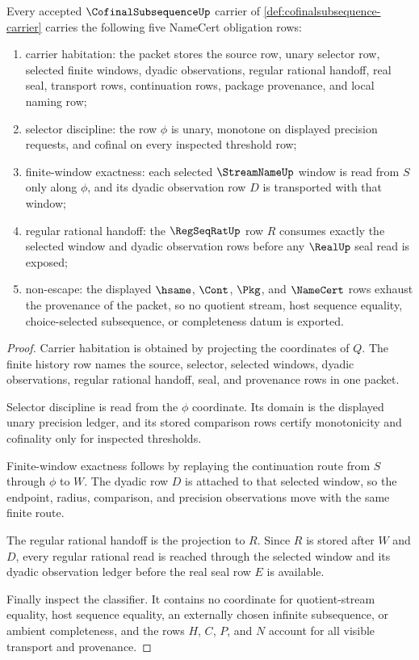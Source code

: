 \begin{theorem}
\label{thm:cofinalsubsequence-namecert-obligations}
Every accepted $\CofinalSubsequenceUp$ carrier of \autoref{def:cofinalsubsequence-carrier} carries the following five NameCert obligation rows:
\begin{enumerate}
\item carrier habitation: the packet stores the source row, unary selector row, selected finite windows, dyadic observations, regular rational handoff, real seal, transport rows, continuation rows, package provenance, and local naming row;
\item selector discipline: the row $\phi$ is unary, monotone on displayed precision requests, and cofinal on every inspected threshold row;
\item finite-window exactness: each selected $\StreamNameUp$ window is read from $S$ only along $\phi$, and its dyadic observation row $D$ is transported with that window;
\item regular rational handoff: the $\RegSeqRatUp$ row $R$ consumes exactly the selected window and dyadic observation rows before any $\RealUp$ seal read is exposed;
\item non-escape: the displayed $\hsame$, $\Cont$, $\Pkg$, and $\NameCert$ rows exhaust the provenance of the packet, so no quotient stream, host sequence equality, choice-selected subsequence, or completeness datum is exported.
\end{enumerate}
\end{theorem}
\begin{proof}
Carrier habitation is obtained by projecting the coordinates of $Q$. The finite history row names the source, selector, selected windows, dyadic observations, regular rational handoff, seal, and provenance rows in one packet.

Selector discipline is read from the $\phi$ coordinate. Its domain is the displayed unary precision ledger, and its stored comparison rows certify monotonicity and cofinality only for inspected thresholds.

Finite-window exactness follows by replaying the continuation route from $S$ through $\phi$ to $W$. The dyadic row $D$ is attached to that selected window, so the endpoint, radius, comparison, and precision observations move with the same finite route.

The regular rational handoff is the projection to $R$. Since $R$ is stored after $W$ and $D$, every regular rational read is reached through the selected window and its dyadic observation ledger before the real seal row $E$ is available.

Finally inspect the classifier. It contains no coordinate for quotient-stream equality, host sequence equality, an externally chosen infinite subsequence, or ambient completeness, and the rows $H$, $C$, $P$, and $N$ account for all visible transport and provenance.
\end{proof}

